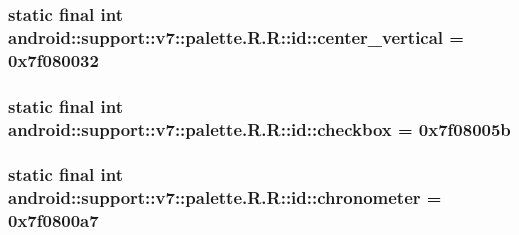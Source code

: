 \hypertarget{classandroid_1_1support_1_1v7_1_1palette_1_1_r_1_1id_aec487c295dd45ca0554a5f59ec7e7c4}{
\subsubsection[{center\_\-vertical}]{\setlength{\rightskip}{0pt plus 5cm}static final int android::support::v7::palette.R.R::id::center\_\-vertical = 0x7f080032}}
\label{classandroid_1_1support_1_1v7_1_1palette_1_1_r_1_1id_aec487c295dd45ca0554a5f59ec7e7c4}


\hypertarget{classandroid_1_1support_1_1v7_1_1palette_1_1_r_1_1id_0ee6d251303e2b774288f02de57e4aab}{
\subsubsection[{checkbox}]{\setlength{\rightskip}{0pt plus 5cm}static final int android::support::v7::palette.R.R::id::checkbox = 0x7f08005b}}
\label{classandroid_1_1support_1_1v7_1_1palette_1_1_r_1_1id_0ee6d251303e2b774288f02de57e4aab}


\hypertarget{classandroid_1_1support_1_1v7_1_1palette_1_1_r_1_1id_5f811a1b6403067a3de6f70e91869409}{
\subsubsection[{chronometer}]{\setlength{\rightskip}{0pt plus 5cm}static final int android::support::v7::palette.R.R::id::chronometer = 0x7f0800a7}}
\label{classandroid_1_1support_1_1v7_1_1palette_1_1_r_1_1id_5f811a1b6403067a3de6f70e91869409}


